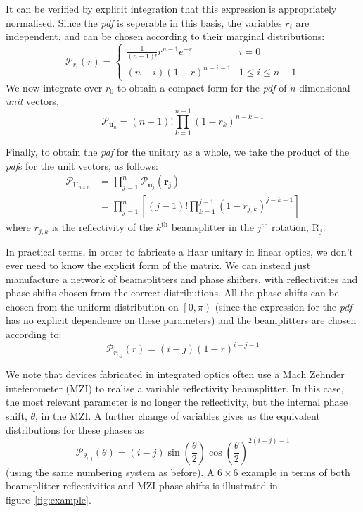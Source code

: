 \documentclass[aps,prl,twocolumn,floatfix]{revtex4}
\renewcommand{\vec}[1]{\mathbf{#1}}
\newcommand{\mat}[1]{\mathrm{#1}}
\newcommand{\by}{\times}
\newcommand{\of}[1]{\!\left(#1\right)}
\newcommand{\pdf}{{\it pdf}}
\newcommand{\prob}[1]{\mathcal{#1}}
\begin{document}
It can be verified by explicit integration that this expression is appropriately
normalised. Since the \pdf{} is seperable in this basis, the variables \( r_i
\) are independent, and can be chosen according to their marginal distributions:
\begin{equation}
  \prob{P}_{r_i} \of{ r } = \left\{ \begin{matrix}
    \frac{1}{ \left( n-1 \right)! } r^{n-1} e^{-r} & i=0 \\
    \left( n-i \right) \left( 1-r \right)^{n-i-1} & 1 \leq i \leq n-1
  \end{matrix} \right.
\end{equation}
We now integrate over \(r_{0}\) to obtain a compact form for the \pdf{} of
\(n\)-dimensional \emph{unit} vectors,
\begin{equation}
  \prob{P}_{ \vec{u}_n } = \left( n-1 \right)! \prod_{k=1}^{n-1} \left( 1-r_k
  \right)^{n-k-1}
\end{equation}

Finally, to obtain the \pdf{} for the unitary as a whole, we take the product
of the \pdf{}s for the unit vectors, as follows:
\begin{align*}
  \prob{P}_{\mat{U}_{n \by n}} &= \prod_{j=1}^{n} \prob{P}_{\vec{u}_j}
  \of{\vec{r_j}} \\
  &= \prod_{j=1}^{n} \left[ \left( j-1 \right)! \prod_{k=1}^{j-1} \left(
  1-r_{j,k} \right)^{j-k-1} \right]
\end{align*}
where \( r_{j,k} \) is the reflectivity of the \( k^{\text{th}} \) beamsplitter
in the \( j^{\text{th}} \) rotation, \( \mat{R}_j \).

In practical terms, in order to fabricate a Haar unitary in linear optics, we
don't ever need to know the explicit form of the matrix. We can instead just
manufacture a network of beamsplitters and phase shifters, with reflectivities
and phase shifts chosen from the correct distributions. All the phase shifts can
be chosen from the uniform distribution on \( \left[ 0,\pi \right) \) (since the
expression for the \pdf{} has no explicit dependence on these parameters) and
the beamplitters are chosen according to:
\begin{equation}
  \prob{P}_{r_{i,j}}\of{r} = \left( i-j \right) \left( 1-r \right)^{i-j-1}
\end{equation}

We note that devices fabricated in integrated optics often use a Mach Zehnder
inteferometer (MZI) to realise a variable reflectivity beamsplitter. In this
case, the most relevant parameter is no longer the reflectivity, but the
internal phase shift, \(\theta\), in the MZI. A further change of variables
gives us the equivalent distributions for these phases as
\begin{equation}
  \prob{P}_{\theta_{i,j}}\of{\theta} = \left( i-j \right) \sin
  \of{\frac{\theta}{2}} \cos \of{\frac{\theta}{2}}^{2 \left(i-j\right)-1} 
\end{equation}
(using the same numbering system as before).
A \( 6 \by 6 \) example in terms of both beamsplitter reflectivities and MZI
phase shifts is illustrated in figure~\ref{fig:example}.
\end{document}
